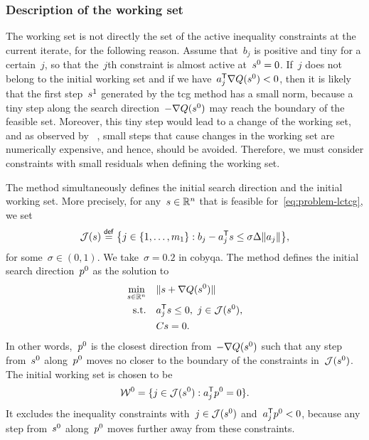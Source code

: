 \subsubsection{Description of the working set}

The working set is not directly the set of the active inequality constraints at the current iterate, for the following reason.
Assume that~$b_j$ is positive and tiny for a certain~$j$, so that the~$j$th constraint is almost active at~$\sstep[0] = 0$.
If~$j$ does not belong to the initial working set and if we have~$a_j^{\T} \nabla Q(\sstep[0]) < 0$, then it is likely that the first step~$\sstep[1]$ generated by the \gls{tcg} method has a small norm, because a tiny step along the search direction~$-\nabla Q(\sstep[0])$ may reach the boundary of the feasible set.
Moreover, this tiny step would lead to a change of the working set, and as observed by \citeauthor{Powell_2015}~\cite[\S~3]{Powell_2015}, small steps that cause changes in the working set are numerically
expensive, and hence, should be avoided.
Therefore, we must consider constraints with small residuals when defining the working set.

The method simultaneously defines the initial search direction and the initial working set.
More precisely, for any~$\sstep \in \R^n$ that is feasible for~\cref{eq:problem-lctcg}, we set
\begin{equation*}
    \mathcal{J}(\sstep) \eqdef \set[\big]{j \in \set{1, \dots, m_1} : b_j - a_j^{\T} \sstep \le \sigma \rad \norm{a_j}},
\end{equation*}
for some~$\sigma \in (0, 1)$.
We take~$\sigma = 0.2$ in \gls{cobyqa}.
The method defines the initial search direction~$\pstep[0]$ as the solution to
\begin{subequations}
    \label{eq:tcg-linear-working-set}
    \begin{align}
        \min_{\sstep \in \R^n}  & \quad \norm{\sstep + \nabla Q(\sstep[0])}\\
        \text{s.t.}             & \quad a_j^{\T} \sstep \le 0, ~ j \in \mathcal{J}(\sstep[0]),\\
                                & \quad C \sstep = 0.
    \end{align}
\end{subequations}
In other words,~$\pstep[0]$ is the closest direction from~$-\nabla Q(\sstep[0])$ such that any step from~$\sstep[0]$ along~$\pstep[0]$ moves no closer to the boundary of the constraints in~$\mathcal{J}(\sstep[0])$.
The initial working set is chosen to be
\begin{equation}
    \label{eq:tcg-linear-working-set-initial}
    \mathcal{W}^0 = \set{j \in \mathcal{J}(\sstep[0]) : a_j^{\T} \pstep[0] = 0}.
\end{equation}
It excludes the inequality constraints with~$j \in \mathcal{J}(\sstep[0])$ and~$a_j^{\T} \pstep[0] < 0$, because any step from~$\sstep[0]$ along~$\pstep[0]$ moves further away from these constraints.

